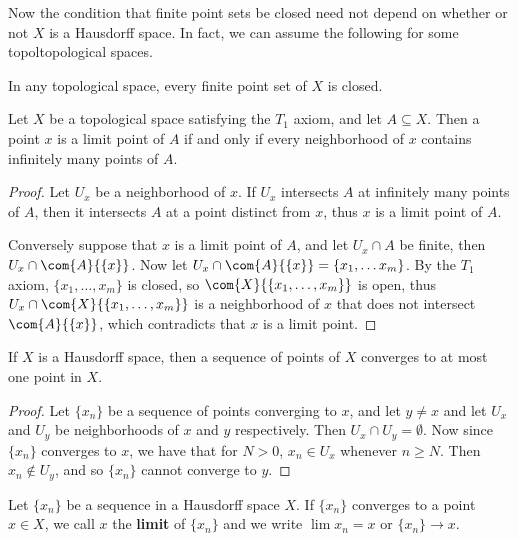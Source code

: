Now the condition that finite point sets be closed need not depend on whether or
not $X$ is a Hausdorff space. In fact, we can assume the following for some
topoltopological spaces.

\begin{axiom}\label{axm1.6.1}
    In any topological space, every finite point set of $X$ is closed.
\end{axiom}

\begin{theorem}\label{1.6.10}
    Let $X$ be a topological space satisfying the $ T_1$ axiom, and let $A
    \subseteq X$. Then a point  $x$ is a limit point of  $A$ if and only if
    every neighborhood of  $x$ contains infinitely many points of  $A$.
\end{theorem}
\begin{proof}
    Let $U_x$ be a neighborhood of  $x$. If  $U_x$ intersects $A$ at infinitely
    many points of  $A$, then it intersects  $A$ at a point distinct from  $x$,
    thus  $x$ is a limit point of  $A$.

    Conversely suppose that  $x$ is a limit point of  $A$, and let  $U_x \cap A$
    be finite, then  $U_x \cap \com{A}{\{x\}}$. Now let  $U_x \cap
    \com{A}{\{x\}}=\{x_1, \dots x_m\}$. By the $T_1$ axiom,  $\{x_1, \dots,
    x_m\}$ is closed, so $\com{X}{\{x_1, \dots,
    x_m\}}$ is open, thus $U_x \cap \com{X}{\{x_1, \dots,
    x_m\}}$ is a neighborhood of $x$ that does not intersect  $\com{A}{\{x\}}$,
    which contradicts that  $x$ is a limit point.
\end{proof}

\begin{theorem}\label{1.6.11}
    If $X$ is a Hausdorff space, then a sequence of points of  $X$ converges to
    at most one point in  $X$.
\end{theorem}
\begin{proof}
    Let $\{x_n\}$ be a sequence of points converging to $x$, and let  $y \neq x$
    and let  $U_x$ and  $U_y$ be neighborhoods of  $x$ and  $y$ respectively.
    Then $U_x \cap U_y = \emptyset$. Now since  $\{x_n\}$ converges to  $x$, we
    have that for $N>0$, $x_n \in U_x$ whenever $n \geq N$. Then $x_n \notin
    U_y$, and so  $\{x_n\}$ cannot converge to  $y$.
\end{proof}

\begin{definition}
    Let $\{x_n\}$ be a sequence in a Hausdorff space  $X$. If  $\{x_n\}$
    converges to a point $x \in X$, we call  $x$ the \textbf{limit} of
    $\{x_n\}$ and we write  $\lim{x_n}=x$ or  $\{x_n\} \rightarrow x$.		
\end{definition}

